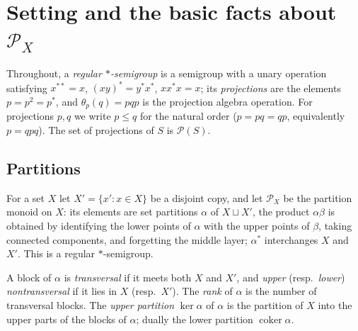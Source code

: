 \documentclass[11pt]{amsart}
\theoremstyle{definition}
\renewcommand{\P}{\mathcal{P}}
\begin{document}
\begin{abstract}
and for a layered generalisation of it, the projection condition and the wiring condition are also sufficient, and they say that $\bot$ is a proper colouring whose bichromatic subgraphs are disjoint unions of complete bipartite graphs; and, as the main new result of these notes, we prove an infinite family of \emph{chain conditions} (W$_n$), valid in every $\P_X$, by an exact counting invariant of the identification graph, exhibit minimal non-embeddable projection algebras of order $2n+5$ violating them, and deduce that the quasivariety generated by the $\P(\P_X)$ is not finitely based (Section~\ref{subsec:count}); (6) report computations: every regular $*$-semigroup of order $\le 8$ satisfying the projection condition embeds in a partition monoid (in $\P_5$ if it is not inverse), and every projection algebra of order $\le5$ satisfying the projection and triangle conditions embeds in $\P(\P_4)$; and (7) make some general remarks (for finite $S$ the quasi-identities of $\{\P_X\}$ decide embeddability; $\P_X$ embeds in the involuted semigroup of binary relations on $2^X$).
\end{abstract}

\tableofcontents

\section{Setting and the basic facts about $\P_X$}\label{sec:setup}

Throughout, a \emph{regular $*$-semigroup} is a semigroup with a unary operation satisfying $x^{**}=x$, $(xy)^*=y^*x^*$, $xx^*x=x$; its \emph{projections} are the elements $p=p^2=p^*$, and $\theta_p(q)=pqp$ is the projection algebra operation. For projections $p,q$ we write $p\le q$ for the natural order ($p=pq=qp$, equivalently $p=qpq$). The set of projections of $S$ is $\P(S)$.

\subsection{Partitions}
For a set $X$ let $X'=\{x':x\in X\}$ be a disjoint copy, and let $\P_X$ be the partition monoid on $X$: its elements are set partitions $\alpha$ of $X\sqcup X'$, the product $\alpha\beta$ is obtained by identifying the lower points of $\alpha$ with the upper points of $\beta$, taking connected components, and forgetting the middle layer; $\alpha^*$ interchanges $X$ and $X'$. This is a regular $*$-semigroup.

A block of $\alpha$ is \emph{transversal} if it meets both $X$ and $X'$, and \emph{upper} (resp.\ \emph{lower}) \emph{nontransversal} if it lies in $X$ (resp.\ $X'$). The \emph{rank} of $\alpha$ is the number of transversal blocks. The \emph{upper partition} $\ker\alpha$ of $\alpha$ is the partition of $X$ into the upper parts of the blocks of $\alpha$; dually the lower partition $\operatorname{coker}\alpha$.
\end{document}
